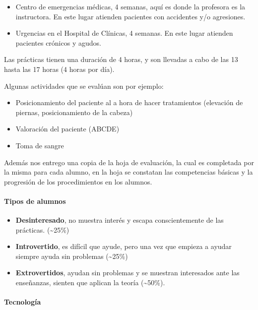 \begin{itemize}
\itemsep1pt\parskip0pt
\item
  Centro de emergencias médicas, 4 semanas, aquí es donde la profesora
  es la instructora. En este lugar atienden pacientes con accidentes y/o
  agresiones.
\item
  Urgencias en el Hospital de Clínicas, 4 semanas. En este lugar
  atienden pacientes crónicos y agudos.
\end{itemize}

Las prácticas tienen una duración de 4 horas, y son llevadas a cabo de
las 13 hasta las 17 horas (4 horas por día).

Algunas actividades que se evalúan son por ejemplo:

\begin{itemize}
\itemsep1pt\parskip0pt
\item
  Posicionamiento del paciente al a hora de hacer tratamientos
  (elevación de piernas, posicionamiento de la cabeza)
\item
  Valoración del paciente (ABCDE)
\item
  Toma de sangre
\end{itemize}

Además nos entrego una copia de la hoja de evaluación, la cual es
completada por la misma para cada alumno, en la hoja se constatan las
competencias básicas y la progresión de los procedimientos en los
alumnos.

\paragraph{Tipos de alumnos}\label{tipos-de-alumnos}

\begin{itemize}
\itemsep1pt\parskip0pt
\item
  \textbf{Desinteresado}, no muestra interés y escapa conscientemente de
  las prácticas. (\textasciitilde{}25\%)
\item
  \textbf{Introvertido}, es difícil que ayude, pero una vez que empieza
  a ayudar siempre ayuda sin problemas (\textasciitilde{}25\%)
\item
  \textbf{Extrovertidos}, ayudan sin problemas y se muestran interesados
  ante las enseñanzas, sienten que aplican la teoría
  (\textasciitilde{}50\%).
\end{itemize}

\paragraph{Tecnología}\label{tecnologuxeda}

